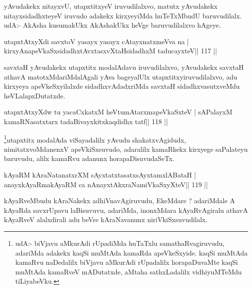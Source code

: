 \begin{artha}
yAvudakekx nitayxvU, utapxtitxyeV iruvudilalxvo, matutx yAvudakekx nitayx\-sidadhxteyeV iruvudo adakekx kirxyeyiMda huTeTxMbudU baruvudilalx. udA:- AkAsha kusumakUkx AkAshakUkx heVge baruvudilalxvo hAgeye.
\end{artha}


\begin{shl}
utapxtAtxyXdi savxtoV yasayx yasayx cAtayxnatxmeVva na |
kirxyAnapeVkaSxsidadhxtAvxtasxvXtaHsidadhxM taducayxteV\hfill || 117 ||
\end{shl}

\begin{artha}
savxtaH yAvudakekx utapxtitx modalAdavu iruvudilalxvo, yAvudakekx savxtaH athavA matotxMdariMdalAgali yAva bageyalUlx utapxtitxyiruvudilalxvo, adu kirxyeya apeVkeSxyilalxde sidadhxvAdadxriMda savxtaH sidadhxvasutxveMdu heVLalapxDutatxde. 
\end{artha}

\begin{shl}
utapxtAtxyXdw tu yacaCxkatxM heVtumAtarxmapeVkaSxteV |
sAPalayxM kamaRNasatxtarx tadaBivayxkitxkaqdidhx tatf\hfill || 118 ||
\end{shl}

\begin{artha}
\footnote[2]{udA:- biVjavu aMkurAdi rUpadiMda huTaTxlu samathaRvagiruvudu, adariMda adakekx kaqSi muMtAda kamaRda apeVkeSxyide. kaqSi muMtAda kamaRvu naDedalilx biVjavu aMkurAdi rUpadalilx horapaDuvaMte kaqSi muMtAda kamaRveV mADutatxde, aMtaha sathxLadalilx vidhiyuMTeMdu tiLiyabeVku.}utapxtitx modalAda viSayadalilx yAvudu shakatxvAgidudx, nimitatxvoMdanenxV apeVkiSxsuvudo, adaralilx kamaRkekx kirxyege saPalateyu baruvudu, alilx kamaRvu adanunx horapaDisuvudaSeTx.
\end{artha}

\begin{shl}
kAyaRM kAraNatanatxrXM sAyxtatxtasatxsAyx\s\s tamxlABataH |
anayxkAyaRmakAyaRM ca nAnayxtAkxraNamiVkaSxyXteV\hfill || 119 ||
\end{shl}

\begin{artha}
kAyaRveMbudu kAraNakekx adhiVnavAgiruvudu, EkeMdare ? adariMdale A kAyaRda savxrUpavu laBisuvuvu, adariMda, inonxMdara kAyaRvAgiralu athavA kAyaRveV alalxdirali adu beVre kAraNavanunx niriVkiSxsuvudilalx.
\end{artha}

